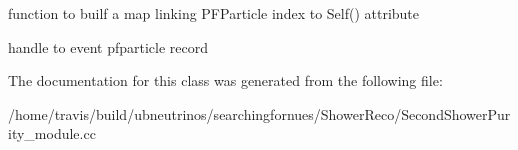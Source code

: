 function to builf a map linking P\+F\+Particle index to Self() attribute 

handle to event pfparticle record 

The documentation for this class was generated from the following file\+:\begin{DoxyCompactItemize}
\item 
/home/travis/build/ubneutrinos/searchingfornues/\+Shower\+Reco/Second\+Shower\+Purity\+\_\+module.\+cc\end{DoxyCompactItemize}
